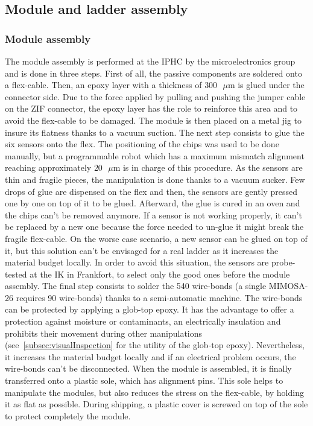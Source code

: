   \subsection{Module and ladder assembly}

    \subsubsection{Module assembly}
    \label{subsec:modAssembly}

    The module assembly is performed at the IPHC by the microelectronics group and is done in three steps.
    First of all, the passive components are soldered onto a flex-cable.
    Then, an epoxy layer with a thickness of $300 \text{ }\mu\text{m}$ is glued under the connector side.
    Due to the force applied by pulling and pushing the jumper cable on the ZIF connector, the epoxy layer has the role to reinforce this area and to avoid the flex-cable to be damaged.
    The module is then placed on a metal jig to insure its flatness thanks to a vacuum suction.
    The next step consists to glue the six sensors onto the flex.
    The positioning of the chips was used to be done manually, but a programmable robot which has a maximum mismatch alignment reaching approximately $20 \text{ }\mu\text{m}$ is in charge of this procedure.
    As the sensors are thin and fragile pieces, the manipulation is done thanks to a vacuum sucker.
    Few drops of glue are dispensed on the flex and then, the sensors are gently pressed one by one on top of it to be glued.
    Afterward, the glue is cured in an oven and the chips can't be removed anymore.
    If a sensor is not working properly, it can't be replaced by a new one because the force needed to un-glue it might break the fragile flex-cable.
    On the worse case scenario, a new sensor can be glued on top of it, but this solution can't be envisaged for a real ladder as it increases the material budget locally.
    In order to avoid this situation, the sensors are probe-tested at the IK in Frankfort, to select only the good ones before the module assembly.
    The final step consists to solder the 540 wire-bonds (a single MIMOSA-26 requires 90 wire-bonds) thanks to a semi-automatic machine.
    The wire-bonds can be protected by applying a glob-top epoxy.
    It has the advantage to offer a protection against moisture or contaminants, an electrically insulation and prohibits their movement during other manipulations (see~\ref{subsec:visualInspection} for the utility of the glob-top epoxy). 
    Nevertheless, it increases the material budget locally and if an electrical problem occurs, the wire-bonds can't be disconnected.
    When the module is assembled, it is finally transferred onto a plastic sole, which has alignment pins.
    This sole helps to manipulate the modules, but also reduces the stress on the flex-cable, by holding it as flat as possible.
    During shipping, a plastic cover is screwed on top of the sole to protect completely the module.

